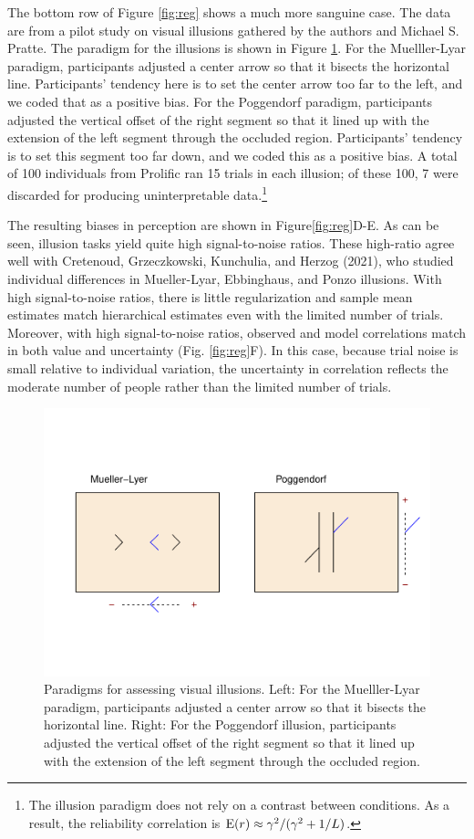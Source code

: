 \documentclass[
  ,man]{apa6}
\begin{document}
The bottom row of Figure \ref{fig:reg} shows a much more sanguine case. The data are from a pilot study on visual illusions gathered by the authors and Michael S. Pratte. The paradigm for the illusions is shown in Figure \ref{fig:ill}. For the Muelller-Lyar paradigm, participants adjusted a center arrow so that it bisects the horizontal line. Participants' tendency here is to set the center arrow too far to the left, and we coded that as a positive bias. For the Poggendorf paradigm, participants adjusted the vertical offset of the right segment so that it lined up with the extension of the left segment through the occluded region. Participants' tendency is to set this segment too far down, and we coded this as a positive bias. A total of 100 individuals from Prolific ran 15 trials in each illusion; of these 100, 7 were discarded for producing uninterpretable data.\footnote{The illusion paradigm does not rely on a contrast between conditions. As a result, the reliability correlation is \(\mbox{E}(r)\approx\gamma^2/(\gamma^2+1/L)\).}

The resulting biases in perception are shown in Figure\ref{fig:reg}D-E. As can be seen, illusion tasks yield quite high signal-to-noise ratios. These high-ratio agree well with Cretenoud, Grzeczkowski, Kunchulia, and Herzog (2021), who studied individual differences in Mueller-Lyar, Ebbinghaus, and Ponzo illusions. With high signal-to-noise ratios, there is little regularization and sample mean estimates match hierarchical estimates even with the limited number of trials. Moreover, with high signal-to-noise ratios, observed and model correlations match in both value and uncertainty (Fig. \ref{fig:reg}F). In this case, because trial noise is small relative to individual variation, the uncertainty in correlation reflects the moderate number of people rather than the limited number of trials.

\begin{figure}
\centering
\includegraphics{p_files/figure-latex/ill-1.pdf}
\caption{\label{fig:ill}Paradigms for assessing visual illusions. Left: For the Muelller-Lyar paradigm, participants adjusted a center arrow so that it bisects the horizontal line. Right: For the Poggendorf illusion, participants adjusted the vertical offset of the right segment so that it lined up with the extension of the left segment through the occluded region.}
\end{figure}
\end{document}
